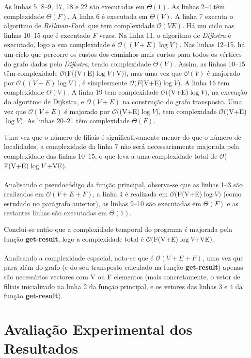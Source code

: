 \documentclass[12pt,a4paper,notitlepage]{article}
\renewcommand{\O}[1]{$\mathcal{O}(#1)$}
\begin{document}
As linhas 5, 8--9, 17, 18 e 22 são executadas em $\Theta(1)$.
As linhas 2--4 têm complexidade $\Theta(F)$.
A linha 6 é executada em $\Theta(V)$.
A linha 7 executa o algoritmo de \emph{Bellman-Ford}, que tem complexidade \O{VE}.
Há um ciclo nas linhas 10--15 que é executado \emph{F} vezes.
Na linha 11, o algoritmo de \emph{Dijkstra} é executado, logo a sua complexidade é \O{(V+E)\log{V}}.
Nas linhas 12--15, há um ciclo que percorre os custos dos caminhos mais curtos para todos os vértices do grafo dados pelo \emph{Dijkstra}, tendo complexidade $\Theta(V)$.
Assim, as linhas 10--15 têm complexidade \O{$F((V+E)$\log{V}$+V)$}, mas uma vez que \O{V} é majorado por \O{(V+E)\log{V}}, é simplesmente \O{F$(V+E)$\log{V}}.
A linha 16 tem complexidade $\Theta(V)$.
A linha 19 tem complexidade \O{$(V+E)$\log{V}}, na execução do algoritmo de Dijkstra, e \O{V+E} na construção do grafo transposto. Uma vez que \O{V+E} é majorado por \O{$(V+E)$\log{V}}, tem complexidade \O{$(V+E)$\log{V}}.
As linhas 20--21 têm complexidade $\Theta(F)$.

Uma vez que o número de filiais é significativamente menor do que o número de localidades, a complexidade da linha 7 não será necessariamente majorada pela complexidade das linhas 10--15, o que leva a uma complexidade total de \O{$F(V+E)$\log{V}$ +VE$}.
\\
\\
Analisando o pseudocódigo da função principal, observa-se que as linhas 1--3 são realizadas em \O{V+E+F}, a linha 4 é realizada em \O{$F(V+E)$\log{V}} (como estudado no parágrafo anterior), as linhas 9--10 são executadas em $\Theta(F)$ e as restantes linhas são executadas em $\Theta(1)$.

Conclui-se então que a complexidade temporal do programa é majorada pela função \textbf{get-result}, logo a complexidade total é \O{$F(V+E)$\log{V}$+VE$}.
\\
\\
Analisando a complexidade espacial, nota-se que é \O{V+E+F}, uma vez que para além do grafo (e do seu transposto calculado na função \textbf{get-result}) apenas são necessários vectores com V ou F elementos (mais concretamente, o vetor de filiais inicializado na linha 2 da função principal, e os vetores das linhas 3 e 4 da função \textbf{get-result}).

\section{Avaliação Experimental dos Resultados}
\end{document}
